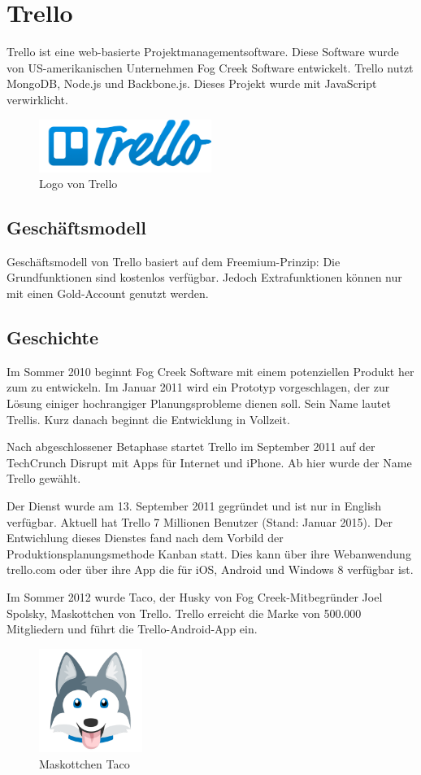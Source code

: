 \section{Trello}
Trello ist eine web-basierte Projektmanagementsoftware. Diese Software wurde von US-amerikanischen Unternehmen Fog Creek Software entwickelt. Trello nutzt MongoDB, Node.js und Backbone.js. Dieses Projekt wurde mit JavaScript verwirklicht.

\begin{figure}[ht]
  \centering
    \includegraphics[width=0.5\textwidth]{trello.png}
  \caption{Logo von Trello}
  \label{fig:trello}
\end{figure}
\subsection{Geschäftsmodell}
Geschäftsmodell von Trello basiert auf dem Freemium-Prinzip: Die Grundfunktionen sind kostenlos verfügbar. Jedoch Extrafunktionen können nur mit einen Gold-Account genutzt werden.
\subsection{Geschichte}
Im Sommer 2010 beginnt Fog Creek Software mit einem potenziellen Produkt her zum zu entwickeln. Im Januar 2011 wird ein Prototyp vorgeschlagen, der zur Lösung einiger hochrangiger Planungsprobleme dienen soll. Sein Name lautet Trellis. Kurz danach beginnt die Entwicklung in Vollzeit.

Nach abgeschlossener Betaphase startet Trello im September 2011 auf der TechCrunch Disrupt mit Apps für Internet und iPhone. Ab hier wurde der Name Trello gewählt.

Der Dienst wurde am 13. September 2011 gegründet und ist nur in English verfügbar. Aktuell hat Trello 7 Millionen Benutzer (Stand: Januar 2015). Der Entwichlung dieses Dienstes fand nach dem Vorbild der Produktionsplanungsmethode Kanban statt. Dies kann über ihre Webanwendung trello.com oder über ihre App die für iOS, Android und Windows 8 verfügbar ist.

Im Sommer 2012 wurde Taco, der Husky von Fog Creek-Mitbegründer Joel Spolsky, Maskottchen von Trello. Trello erreicht die Marke von 500.000 Mitgliedern und führt die Trello-Android-App ein.
\begin{figure}[ht]
  \centering
    \includegraphics[width=0.3\textwidth]{taco.png}
  \caption{Maskottchen Taco}
  \label{fig:taco}
\end{figure}
